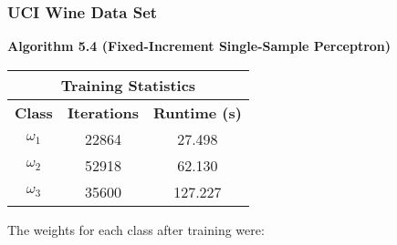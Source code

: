 \documentclass{article}
\newcommand{\result}[1]{\subsubsection*{#1}}
\newcommand{\fakesection}[1]{{\bf #1}\par}
\begin{document}
\result{UCI Wine Data Set}
\fakesection{Algorithm 5.4 (Fixed-Increment Single-Sample Perceptron)}
\begin{center}
\begin{tabular}{|c|c|c|}
\hline\multicolumn{3}{|c|}{{\bf Training Statistics}}\\
\hline{\bf Class} & {\bf Iterations} & {\bf Runtime (s)}\\\hline
$\omega_1$ & 22864 & 27.498 \\
$\omega_2$ & 52918 & 62.130 \\
$\omega_3$ & 35600 & 127.227\\\hline
\end{tabular}
\end{center}

The weights for each class after training were:
\end{document}
